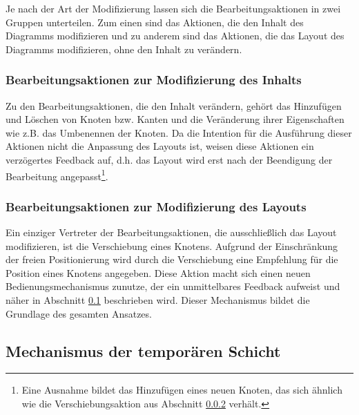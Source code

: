 Je nach der Art der Modifizierung lassen sich die Bearbeitungsaktionen in zwei Gruppen unterteilen. Zum einen sind das Aktionen, die den Inhalt des Diagramms modifizieren und zu anderem sind das Aktionen, die das Layout des Diagramms modifizieren, ohne den Inhalt zu verändern.

\subsubsection{Bearbeitungsaktionen zur Modifizierung des Inhalts}

Zu den Bearbeitungsaktionen, die den Inhalt verändern, gehört das Hinzufügen und Löschen von Knoten bzw. Kanten und die Veränderung ihrer Eigenschaften wie z.B. das Umbenennen der Knoten. Da die Intention für die Ausführung dieser Aktionen nicht die Anpassung des Layouts ist, weisen diese Aktionen ein verzögertes Feedback auf, d.h. das Layout wird erst nach der Beendigung der Bearbeitung angepasst\footnote{Eine Ausnahme bildet das Hinzufügen eines neuen Knoten, das sich ähnlich wie die Verschiebungsaktion aus Abschnitt \ref{subsubsec:edit-action-for-modifying-layout} verhält.}.

\subsubsection{Bearbeitungsaktionen zur Modifizierung des Layouts}
\label{subsubsec:edit-action-for-modifying-layout}

Ein einziger Vertreter der Bearbeitungsaktionen, die ausschließlich das Layout modifizieren, ist die Verschiebung eines Knotens. Aufgrund der Einschränkung der freien Positionierung wird durch die Verschiebung eine Empfehlung für die Position eines Knotens angegeben. Diese Aktion macht sich einen neuen Bedienungsmechanismus zunutze, der ein unmittelbares Feedback aufweist und näher in Abschnitt \ref{subsec:temporary-layer-mechanism} beschrieben wird. Dieser Mechanismus bildet die Grundlage des gesamten Ansatzes.

\subsection{Mechanismus der temporären Schicht}
\label{subsec:temporary-layer-mechanism}


